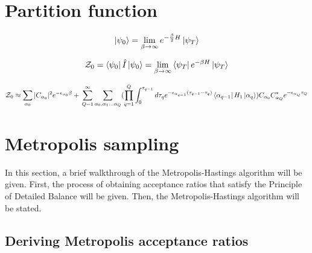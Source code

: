 \documentclass[12pt, two sided]{article}
\begin{document}
\section{Partition function}

\begin{equation}
\ket{\psi_0} = \lim_{\beta\to\infty} e^{-\frac{\beta}{2} H} \ket{\psi_T}
\end{equation}

\begin{equation}
\mathcal{Z}_0 = \bra{\psi_0} \hat{I} \ket{\psi_0} = \lim_{\beta\to\infty} \bra{\psi_T} e^{-\beta H} \ket{\psi_T}
\end{equation}

\begin{equation}
\label{eq:Z_0}
\mathcal{Z}_0 \approx \sum_{\alpha_0} \vert C_{\alpha_0} \vert^2 e^{-\epsilon_{\alpha_0} \beta} + \\
\sum_{Q=1}^{\infty} \sum_{\alpha_0, \alpha_1 \dots \alpha_Q} (\prod_{q=1}^Q \int_0^{\tau_{q-1}} d\tau_q e^{-\epsilon_{\alpha_{q-1}}(\tau_{q-1}-\tau_q)} 
\bra{\alpha_{q-1}} H_1 \ket{\alpha_q}) C_{\alpha_0} C_{\alpha_Q}^* e^{-\epsilon_{\alpha_Q} \tau_Q}
\end{equation}
\section{Metropolis sampling}

In this section, a brief walkthrough of the Metropolis-Hastings algorithm \cite{doi:10.1063/1.1699114} will be given. First, the process of obtaining acceptance ratios that satisfy the Principle of Detailed Balance will be given. Then, the Metropolis-Hastings algorithm will be stated.

\subsection{Deriving Metropolis acceptance ratios}
\end{document}
